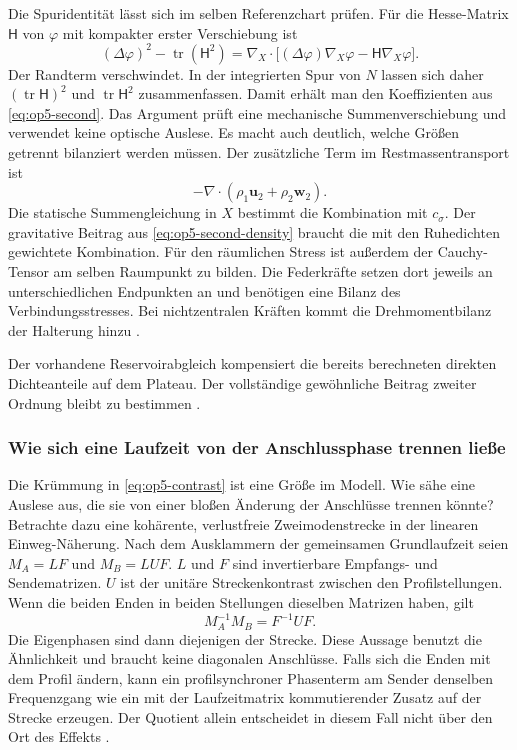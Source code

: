 Die Spuridentität lässt sich im selben Referenzchart prüfen. Für die Hesse-Matrix \(\mathsf H\) von \(\varphi\) mit kompakter erster Verschiebung ist
\[
 (\Delta\varphi)^2-\operatorname{tr}(\mathsf H^2)
 =\nabla_X\cdot\big[(\Delta\varphi)\nabla_X\varphi
                    -\mathsf H\nabla_X\varphi\big].
\]
Der Randterm verschwindet. In der integrierten Spur von \(N\) lassen sich daher \((\operatorname{tr}\mathsf H)^2\) und \(\operatorname{tr}\mathsf H^2\) zusammenfassen. Damit erhält man den Koeffizienten aus \eqref{eq:op5-second}. Das Argument prüft eine mechanische Summenverschiebung und verwendet keine optische Auslese. Es macht auch deutlich, welche Größen getrennt bilanziert werden müssen. Der zusätzliche Term im Restmassentransport ist
\begin{equation}
 -\nabla\cdot(\rho_1\mathbf u_2+\rho_2\mathbf w_2).
 \label{eq:op5-second-density}
\end{equation}
Die statische Summengleichung in \(X\) bestimmt die Kombination mit \(c_\sigma\). Der gravitative Beitrag aus \eqref{eq:op5-second-density} braucht die mit den Ruhedichten gewichtete Kombination. Für den räumlichen Stress ist außerdem der Cauchy-Tensor am selben Raumpunkt zu bilden. Die Federkräfte setzen dort jeweils an unterschiedlichen Endpunkten an und benötigen eine Bilanz des Verbindungsstresses. Bei nichtzentralen Kräften kommt die Drehmomentbilanz der Halterung hinzu \cite{op5-elastic-limit}.

Der vorhandene Reservoirabgleich kompensiert die bereits berechneten direkten Dichteanteile auf dem Plateau. Der vollständige gewöhnliche Beitrag zweiter Ordnung bleibt zu bestimmen \cite{op5-reservoir,op5-elastic-limit}.

\subsubsection{Wie sich eine Laufzeit von der Anschlussphase trennen ließe}
\label{sec:op5-calibration}

Die Krümmung in \eqref{eq:op5-contrast} ist eine Größe im Modell. Wie sähe eine Auslese aus, die sie von einer bloßen Änderung der Anschlüsse trennen könnte? Betrachte dazu eine kohärente, verlustfreie Zweimodenstrecke in der linearen Einweg-Näherung. Nach dem Ausklammern der gemeinsamen Grundlaufzeit seien \(M_A=LF\) und \(M_B=LUF\). \(L\) und \(F\) sind invertierbare Empfangs- und Sendematrizen. \(U\) ist der unitäre Streckenkontrast zwischen den Profilstellungen. Wenn die beiden Enden in beiden Stellungen dieselben Matrizen haben, gilt
\begin{equation}
 M_A^{-1}M_B=F^{-1}UF .
 \label{eq:op5-ab-calibration}
\end{equation}
Die Eigenphasen sind dann diejenigen der Strecke. Diese Aussage benutzt die Ähnlichkeit und braucht keine diagonalen Anschlüsse. Falls sich die Enden mit dem Profil ändern, kann ein profilsynchroner Phasenterm am Sender denselben Frequenzgang wie ein mit der Laufzeitmatrix kommutierender Zusatz auf der Strecke erzeugen. Der Quotient allein entscheidet in diesem Fall nicht über den Ort des Effekts \cite{op5-budget}.

